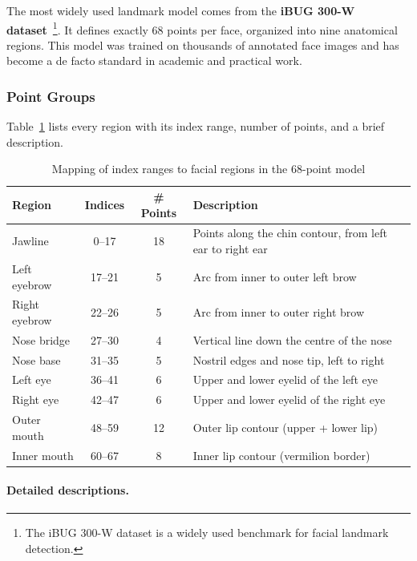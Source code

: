 The most widely used landmark model comes from the \textbf{iBUG 300-W dataset}~\footnote{The iBUG 300-W dataset is a widely used benchmark for facial landmark detection.}. It defines exactly 68 points per face, organized into nine anatomical regions. This model was trained on thousands of annotated face images and has become a de facto standard in academic and practical work.

\subsubsection*{Point Groups}

Table~\ref{tab:landmark-regions} lists every region with its index range, number of points, and a brief description.

\begin{table}[htbp]
    \centering
    \caption{Mapping of index ranges to facial regions in the 68-point model}
    \label{tab:landmark-regions}
    \begin{tabular}{@{} l c c p{6cm} @{}}
        \toprule
        \textbf{Region} & \textbf{Indices} & \textbf{\# Points} & \textbf{Description} \\
        \midrule
        Jawline & 0--17 & 18 & Points along the chin contour, from left ear to right ear \\
        Left eyebrow & 17--21 & 5 & Arc from inner to outer left brow \\
        Right eyebrow & 22--26 & 5 & Arc from inner to outer right brow \\
        Nose bridge & 27--30 & 4 & Vertical line down the centre of the nose \\
        Nose base & 31--35 & 5 & Nostril edges and nose tip, left to right \\
        Left eye & 36--41 & 6 & Upper and lower eyelid of the left eye \\
        Right eye & 42--47 & 6 & Upper and lower eyelid of the right eye \\
        Outer mouth & 48--59 & 12 & Outer lip contour (upper + lower lip) \\
        Inner mouth & 60--67 & 8 & Inner lip contour (vermilion border) \\
        \bottomrule
    \end{tabular}
\end{table}

\paragraph*{Detailed descriptions.}

